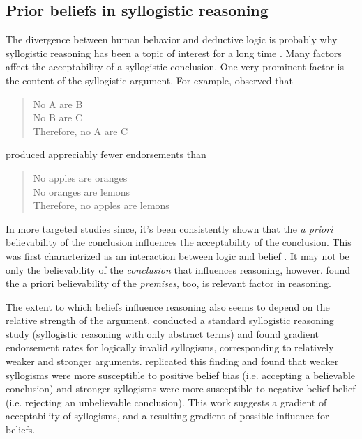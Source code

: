 \documentclass{llncs} %
\begin{document}
\subsection{Prior beliefs in syllogistic reasoning}

The divergence between human behavior and deductive logic is probably why syllogistic reasoning has been a topic of interest for a long time \cite{Storring1908,Woodworth1935, Chapman1959, JL1978, Chater1999}. Many factors affect the acceptability of a syllogistic conclusion. One very prominent factor is the content of the syllogistic argument. For example,  observed that

\begin{quote}
No A are B\\
No B are C\\
Therefore, no A are C
\end{quote}

produced appreciably fewer endorsements than 

\begin{quote}
No apples are oranges\\
No oranges are lemons\\
Therefore, no apples are lemons
\end{quote}

In more targeted studies since, it's been consistently shown that the \emph{a priori} believability of the conclusion influences the acceptability of the conclusion. This was first characterized as an interaction between logic and belief \cite{Evans1983}. It may not be only the believability of the \emph{conclusion} that influences reasoning, however.  found the a priori believability of the \emph{premises}, too, is relevant factor in reasoning. 


The extent to which beliefs influence reasoning also seems to depend on the relative strength of the argument.  conducted a standard syllogistic reasoning study (syllogistic reasoning with only abstract terms) and found gradient endorsement rates for logically invalid syllogisms, corresponding to relatively weaker and stronger arguments.  replicated this finding and found that weaker syllogisms were more susceptible to positive belief bias (i.e. accepting a believable conclusion) and stronger syllogisms were more susceptible to negative belief belief (i.e. rejecting an unbelievable conclusion). This work suggests a gradient of acceptability of syllogisms, and a resulting gradient of possible influence for beliefs. 
\end{document}
